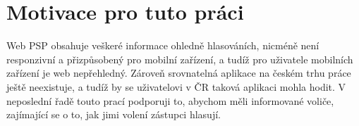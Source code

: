 \section{Motivace pro tuto práci}
Web PSP obsahuje veškeré informace ohledně hlasováních, nicméně není responzivní a přizpůsobený pro mobilní zařízení, a tudíž pro uživatele mobilních zařízení je web nepřehledný. Zároveň srovnatelná aplikace na českém trhu práce ještě neexistuje, a tudíž by se uživatelovi v ČR taková aplikaci mohla hodit. V neposlední řadě touto prací podporuji to, abychom měli informované voliče, zajímající se o to, jak jimi volení zástupci hlasují.